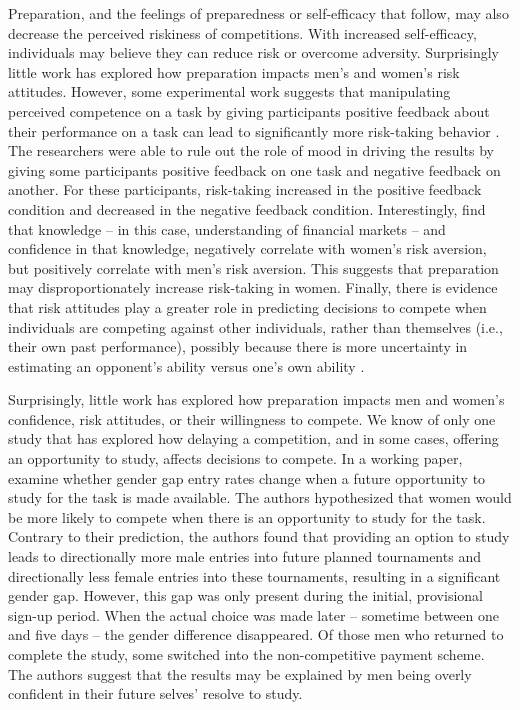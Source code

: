 \documentclass[a4paper, nobind]{templates/ociamthesis}
\begin{document}
Preparation, and the feelings of preparedness or self-efficacy that follow, may also decrease the perceived riskiness of competitions. With increased self-efficacy, individuals may believe they can reduce risk or overcome adversity. Surprisingly little work has explored how preparation impacts men's and women's risk attitudes. However, some experimental work suggests that manipulating perceived competence on a task by giving participants positive feedback about their performance on a task can lead to significantly more risk-taking behavior \autocite{Krueger1994}. The researchers were able to rule out the role of mood in driving the results by giving some participants positive feedback on one task and negative feedback on another. For these participants, risk-taking increased in the positive feedback condition and decreased in the negative feedback condition. Interestingly, \textcite{Gysler2002} find that knowledge -- in this case, understanding of financial markets -- and confidence in that knowledge, negatively correlate with women's risk aversion, but positively correlate with men's risk aversion. This suggests that preparation may disproportionately increase risk-taking in women. Finally, there is evidence that risk attitudes play a greater role in predicting decisions to compete when individuals are competing against other individuals, rather than themselves (i.e., their own past performance), possibly because there is more uncertainty in estimating an opponent's ability versus one's own ability \autocite{Apicella2017a}.

Surprisingly, little work has explored how preparation impacts men and women's confidence, risk attitudes, or their willingness to compete. We know of only one study that has explored how delaying a competition, and in some cases, offering an opportunity to study, affects decisions to compete. In a working paper, \textcite{Charness2021} examine whether gender gap entry rates change when a future opportunity to study for the task is made available. The authors hypothesized that women would be more likely to compete when there is an opportunity to study for the task. Contrary to their prediction, the authors found that providing an option to study leads to directionally more male entries into future planned tournaments and directionally less female entries into these tournaments, resulting in a significant gender gap. However, this gap was only present during the initial, provisional sign-up period. When the actual choice was made later -- sometime between one and five days -- the gender difference disappeared. Of those men who returned to complete the study, some switched into the non-competitive payment scheme. The authors suggest that the results may be explained by men being overly confident in their future selves' resolve to study.
\end{document}
